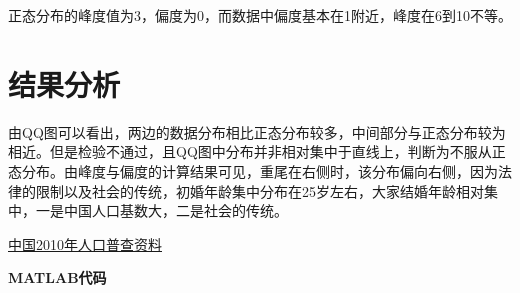 \documentclass{ctexart}
\begin{document}
正态分布的峰度值为3，偏度为0，而数据中偏度基本在1附近，峰度在6到10不等。

\section{结果分析}
由QQ图可以看出，两边的数据分布相比正态分布较多，中间部分与正态分布较为相近。但是检验不通过，且QQ图中分布并非相对集中于直线上，判断为不服从正态分布。由峰度与偏度的计算结果可见，重尾在右侧时，该分布偏向右侧，因为法律的限制以及社会的传统，初婚年龄集中分布在25岁左右，大家结婚年龄相对集中，一是中国人口基数大，二是社会的传统。


\begin{thebibliography}{99}  

\href{http://www.stats.gov.cn/tjsj/pcsj/rkpc/6rp/indexch.htm}{中国2010年人口普查资料}
\end{thebibliography}

\textbf{MATLAB代码}
\end{document}
